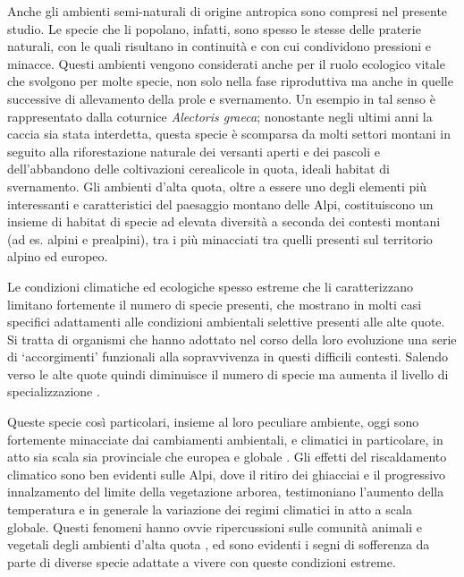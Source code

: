 \documentclass[10pt,twoside,openany,x11names,svgnames,italian,a5paper,dvipsnames,table]{memoir}
\begin{document}
Anche gli ambienti semi-naturali di origine antropica sono compresi nel presente studio. Le specie che li popolano, infatti, sono spesso le stesse delle praterie naturali, con le quali risultano in continuità e con cui condividono pressioni e minacce. Questi ambienti vengono considerati anche per il ruolo ecologico vitale che svolgono per molte specie, non solo nella fase riproduttiva ma anche in quelle successive di allevamento della prole e svernamento. Un esempio in tal senso è rappresentato dalla coturnice \emph{Alectoris graeca}; nonostante negli ultimi anni la caccia sia stata interdetta, questa specie è scomparsa da molti settori montani in seguito alla riforestazione naturale dei versanti aperti e dei pascoli e dell'abbandono delle coltivazioni cerealicole in quota, ideali habitat di svernamento. 
Gli ambienti d’alta quota, oltre a essere uno degli elementi più interessanti e caratteristici del paesaggio montano delle Alpi, costituiscono un insieme di habitat di specie ad elevata diversità a seconda dei contesti montani (ad es. alpini e prealpini),   tra i più minacciati tra quelli presenti sul territorio alpino ed europeo.

Le condizioni climatiche ed ecologiche spesso estreme che li caratterizzano limitano fortemente il numero di specie presenti, che mostrano in molti casi specifici adattamenti alle condizioni ambientali selettive presenti alle alte quote. Si tratta di organismi che hanno adottato nel corso della loro evoluzione una serie di ‘accorgimenti’ funzionali alla sopravvivenza in questi difficili contesti. Salendo verso le alte quote quindi diminuisce il numero di specie ma aumenta il livello di specializzazione \cite{Nagy03} \cite{Gonzalez10} \cite{Dirnbock11}.

Queste specie così particolari, insieme al loro peculiare ambiente, oggi sono fortemente minacciate dai cambiamenti ambientali, e climatici in particolare, in atto sia scala sia provinciale che europea e globale \cite{Bellard12} \cite{Chamberlain13}. Gli effetti del riscaldamento climatico sono ben evidenti sulle Alpi, dove il ritiro dei ghiacciai e il progressivo innalzamento del limite della vegetazione arborea, testimoniano l’aumento della temperatura e in generale la variazione dei regimi climatici in atto a scala globale. Questi fenomeni hanno ovvie ripercussioni sulle comunità animali e vegetali degli ambienti d’alta quota \cite{Brambilla14}, ed sono evidenti i segni di sofferenza da parte di diverse specie adattate a vivere con queste condizioni estreme. 
\end{document}
